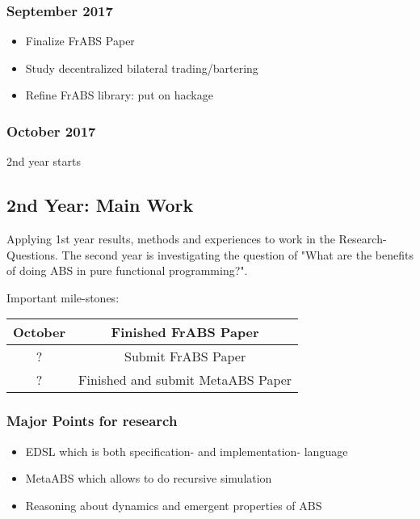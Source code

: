 \subsubsection{September 2017}
\begin{itemize}
	\item Finalize FrABS Paper
	\item Study decentralized bilateral trading/bartering
	\item Refine FrABS library: put on hackage
\end{itemize}

\subsubsection{October 2017}
2nd year starts




\subsection{2nd Year: Main Work}
Applying 1st year results, methods and experiences to work in the Research-Questions. The second year is investigating the question of "What are the benefits of doing ABS in pure functional programming?".

Important mile-stones:

\begin{center}
\begin{tabular}{ c | c } 
	October & Finished FrABS Paper \\
	\hline
	? & Submit FrABS Paper \\
	\hline
	? & Finished and submit MetaABS Paper \\
\end{tabular}
\end{center}

\subsubsection{Major Points for research}
\begin{itemize}
	\item EDSL which is both specification- and implementation- language
	\item MetaABS which allows to do recursive simulation
	\item Reasoning about dynamics and emergent properties of ABS
\end{itemize}

